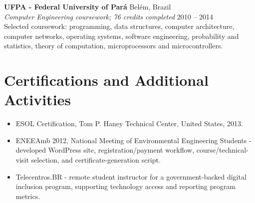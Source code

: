 \documentclass[10pt,a4paper]{article}
\newcommand{\eduentry}[5]{%
  \textbf{#1} \hfill {\small\color{muted}#2}\\[-0.05em]
  {\emph{#3}} \hfill {\small\color{muted}#4}\\[-0.05em]
  {\small #5}\vspace{0.3em}
}
\begin{document}
\eduentry{UFPA - Federal University of Pará}{Belém, Brazil}{Computer Engineering coursework; 76 credits completed}{2010 -- 2014}{Selected coursework: programming, data structures, computer architecture, computer networks, operating systems, software engineering, probability and statistics, theory of computation, microprocessors and microcontrollers.}

\section{Certifications and Additional Activities}
\begin{itemize}
  \item ESOL Certification, Tom P. Haney Technical Center, United States, 2013.
  \item ENEEAmb 2012, National Meeting of Environmental Engineering Students - developed WordPress site, registration/payment workflow, course/technical-visit selection, and certificate-generation script.
  \item Telecentros.BR - remote student instructor for a government-backed digital inclusion program, supporting technology access and reporting program metrics.
\end{itemize}
\end{document}
